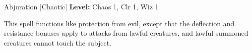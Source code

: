 {Abjuration [Chaotic]}
{
	\textbf{Level:}
	Chaos 1, Clr 1, Wiz 1\\
}
{
	This spell functions like protection from evil, except that the deflection and resistance bonuses apply to attacks from lawful creatures, and lawful summoned creatures cannot touch the subject.

}

